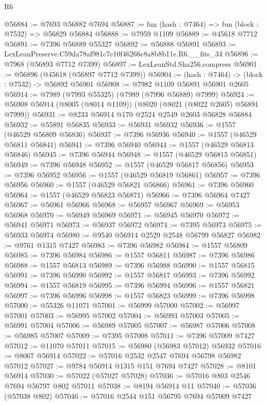 \begin{lexlean}{R6}
\begin{coremodule}
@56884 := @7693 @56882 @7694
@56887 := fun (hash : @7464) => fun (block : @7532) => @56829 @56884
@56888 := @7959 @1109
@56889 := @45618 @7712
@56891 := @7396 @56889 @55327
@56892 := @56888 @56891
@56893 := LexLeanPreserve.C59da78af981c7e10f46266c8a8b8b11e.R6.__fits_34
@56896 := @7968 (@56893 @7712 @7399)
@56897 := LexLeanStd.Sha256.compress
@56901 := @56896 (@45618 (@56897 @7712 @7399))
@56904 := (hash : @7464) -> (block : @7532) -> @56892 @56901
@56908 := @7982 @1109 @56891 @56901 @2605
@56914 := @7989 (@7993 @55325) (@7989 (@7996 @56889) @7999)
@56924 := @56908 @56914 (@8005 (@8014 @1109)) (@8020 (@8021 (@8022 @2605) @56891 @7999))
@56931 := @8233 @56914 @170 @2524 @2549 @2603 @56828 @56884
@56932 := @55891 @56835
@56933 := @56931 @56932
@56936 := @1557 (@46529 @56809 @56836)
@56937 := @7396 @56936
@56940 := @1557 (@46529 @56811 @56841)
@56941 := @7396 @56940
@56944 := @1557 (@46529 @56813 @56846)
@56945 := @7396 @56944
@56948 := @1557 (@46529 @56815 @56851)
@56949 := @7396 @56948
@56952 := @1557 (@46529 @56817 @56856)
@56953 := @7396 @56952
@56956 := @1557 (@46529 @56819 @56861)
@56957 := @7396 @56956
@56960 := @1557 (@46529 @56821 @56866)
@56961 := @7396 @56960
@56964 := @1557 (@46529 @56823 @56871)
@56966 := @7396 @56964 @7427
@56967 := @56961 @56966
@56968 := @56957 @56967
@56969 := @56953 @56968
@56970 := @56949 @56969
@56971 := @56945 @56970
@56972 := @56941 @56971
@56973 := @56937 @56972
@56974 := @7395 @56973
@56975 := @56933 @56974
@56980 := @9540 @56914 @2529 @2548 @56799 @56827
@56982 := @9761 @1315 @7427
@56983 := @7396 @56982
@56984 := @1557 @56809
@56985 := @7396 @56984
@56986 := @1557 @56811
@56987 := @7396 @56986
@56988 := @1557 @56813
@56989 := @7396 @56988
@56990 := @1557 @56815
@56991 := @7396 @56990
@56992 := @1557 @56817
@56993 := @7396 @56992
@56994 := @1557 @56819
@56995 := @7396 @56994
@56996 := @1557 @56821
@56997 := @7396 @56996
@56998 := @1557 @56823
@56999 := @7396 @56998
@57000 := @55326 @11071
@57001 := @56999 @57000
@57002 := @56997 @57001
@57003 := @56995 @57002
@57004 := @56993 @57003
@57005 := @56991 @57004
@57006 := @56989 @57005
@57007 := @56987 @57006
@57008 := @56985 @57007
@57009 := @7395 @57008
@57011 := @7396 @57009 @7427
@57012 := @11070 @57011
@57015 := @56980 (@56983 @57012) @56932
@57016 := @8067 @56914
@57022 := @57016 @2532 @2547 @7694 @56798 @56982 @57012
@57027 := @9784 @56914 @1315 @151 @7694 @7427
@57028 := @8101 @56914
@57030 := @57022 (@57027 @57028)
@57036 := @57016 @803 @2546 @7694 @56797 @802 @57011
@57038 := @8194 @56914 @11
@57040 := @57036 (@57038 @802)
@57046 := @57016 @2544 @151 @56795 @7694 @57009 @7427

\end{coremodule}
\end{lexlean}
